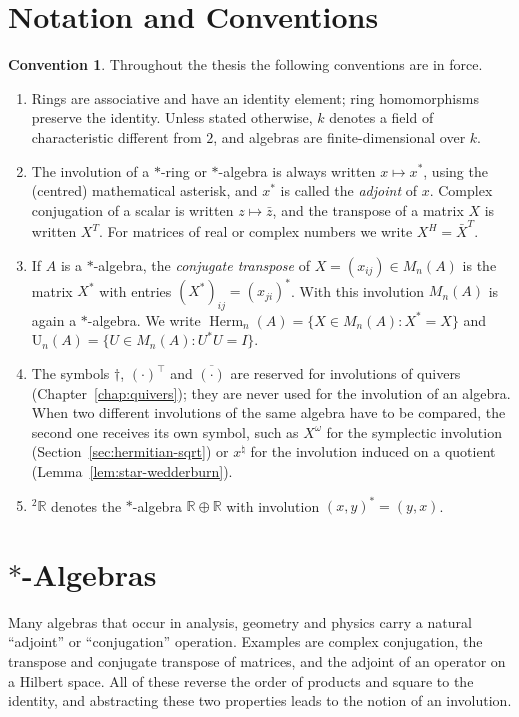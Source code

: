 \documentclass[12pt, a4paper]{report}
\theoremstyle{plain}
\theoremstyle{definition}
\newtheorem{convention}[theorem]{Convention}
\theoremstyle{remark}
\theoremstyle{plain}
\newcommand{\RR}{\mathbb{R}}
\newcommand{\Un}{\mathrm{U}}
\newcommand{\Herm}{\operatorname{Herm}}
\newcommand{\twoR}{{}^{2}\mathbb{R}}
\begin{document}
\section{Notation and Conventions}
\label{sec:notation}
\begin{convention}\label{conv:notation}
Throughout the thesis the following conventions are in force.
\begin{enumerate}
  \item Rings are associative and have an identity element; ring homomorphisms preserve the identity. Unless stated otherwise, $k$ denotes a field of characteristic different from $2$, and algebras are finite-dimensional over $k$.
  \item The involution of a $*$-ring or $*$-algebra is always written $x\mapsto x^*$, using the (centred) mathematical asterisk, and $x^*$ is called the \emph{adjoint} of $x$. Complex conjugation of a scalar is written $z\mapsto\bar z$, and the transpose of a matrix $X$ is written $X^T$. For matrices of real or complex numbers we write $X^H=\bar X^T$.
  \item If $A$ is a $*$-algebra, the \emph{conjugate transpose} of $X=(x_{ij})\in M_n(A)$ is the matrix $X^*$ with entries $(X^*)_{ij}=(x_{ji})^*$. With this involution $M_n(A)$ is again a $*$-algebra. We write $\Herm_n(A)=\{X\in M_n(A): X^*=X\}$ and $\Un_n(A)=\{U\in M_n(A): U^*U=I\}$.
  \item The symbols $\dagger$, $(\cdot)^{\top}$ and $\overline{(\cdot)}$ are reserved for involutions of quivers (Chapter~\ref{chap:quivers}); they are never used for the involution of an algebra. When two different involutions of the same algebra have to be compared, the second one receives its own symbol, such as $X^\omega$ for the symplectic involution (Section~\ref{sec:hermitian-sqrt}) or $x^\natural$ for the involution induced on a quotient (Lemma~\ref{lem:star-wedderburn}).
  \item $\twoR$ denotes the $*$-algebra $\RR\oplus\RR$ with involution $(x,y)^*=(y,x)$.
\end{enumerate}
\end{convention}

\section{\texorpdfstring{$*$}{*}-Algebras}
\label{sec:staralg-def}
Many algebras that occur in analysis, geometry and physics carry a natural ``adjoint'' or ``conjugation'' operation. Examples are complex conjugation, the transpose and conjugate transpose of matrices, and the adjoint of an operator on a Hilbert space. All of these reverse the order of products and square to the identity, and abstracting these two properties leads to the notion of an involution.
\end{document}
